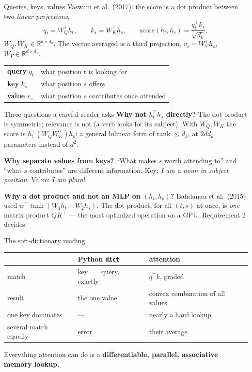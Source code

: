 \documentclass[11pt,aspectratio=169]{beamer}
\newcommand{\R}{\mathbb{R}}
\newcommand{\T}{^{\top}}
\newcommand{\dest}[1]{\textcolor{structure}{\textbf{#1}}}
\begin{document}
\begin{frame}{Queries, keys, values}
  Vaswani et al.\ (2017): the score is a dot product between two \emph{linear projections},
  \[
    q_t = W_Q\T h_t,\qquad k_s = W_K\T h_s,\qquad
    \mathrm{score}(h_t,h_s) = \frac{q_t\T k_s}{\sqrt{d_k}},
  \]
  $W_Q,W_K\in\R^{d\times d_k}$. The vector averaged is a third projection, $v_s = W_V\T h_s$,
  $W_V\in\R^{d\times d_v}$.

  \vspace{0.8em}
  \begin{tabular}{@{}ll@{}}
    \dest{query} $q_t$ & what position $t$ is looking for \\
    \dest{key} $k_s$ & what position $s$ offers \\
    \dest{value} $v_s$ & what position $s$ contributes once attended \\
  \end{tabular}
\end{frame}

\begin{frame}{Three questions a careful reader asks}
  \textbf{Why not $h_t\T h_s$ directly?} The dot product is symmetric; relevance is not
  (a verb looks for its subject). With $W_Q, W_K$ the score is $h_t\T(W_QW_K\T)h_s$: a
  general bilinear form of rank $\le d_k$, at $2dd_k$ parameters instead of $d^2$.

  \vspace{0.7em}
  \textbf{Why separate values from keys?} ``What makes $s$ worth attending to'' and ``what
  $s$ contributes'' are different information. Key: \emph{I am a noun in subject position}.
  Value: \emph{I am plural}.

  \vspace{0.7em}
  \textbf{Why a dot product and not an MLP on $(h_t,h_s)$?} Bahdanau et al.\ (2015) used
  $w\T\tanh(W_1h_t + W_2h_s)$. The dot product, for all $(t,s)$ at once, is \emph{one}
  matrix product $QK\T$ --- the most optimized operation on a GPU. Requirement 2 decides.
\end{frame}

\begin{frame}{The soft-dictionary reading}
  \begin{center}
  \begin{tabular}{@{}lll@{}}
    \toprule
    & Python \texttt{dict} & attention \\
    \midrule
    match & key $=$ query, exactly & $q\T k$, graded \\
    result & the one value & convex combination of all values \\
    one key dominates & --- & nearly a hard lookup \\
    several match equally & error & their average \\
    \bottomrule
  \end{tabular}
  \end{center}

  \vspace{1em}
  Everything attention can do is a \dest{differentiable, parallel, associative memory
  lookup}.
\end{frame}
\end{document}
